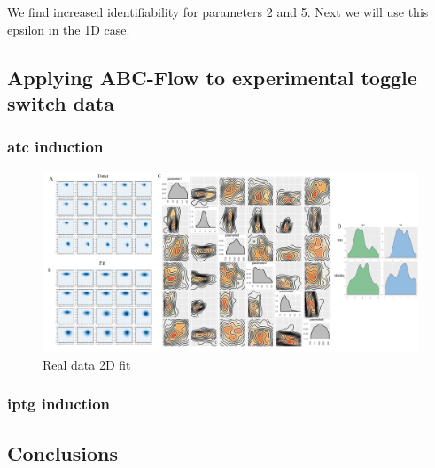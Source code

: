 We find increased identifiability for parameters 2 and 5. Next we will use this epsilon in the 1D case.

\clearpage


\subsection{Applying ABC-Flow to experimental toggle switch data}
 
 
  \subsubsection{\acrshort{atc} induction}
 
 
 \begin{figure}[htbp]
\centering
\includegraphics[scale=0.5]{chapterABCFlow/images/real_dat/real_dat_2D.png}
\caption[LoF caption]{Real data 2D fit}
\label{fig:real_dat_2d}
\end{figure}
\clearpage
\subsubsection{\acrshort{iptg} induction}
\subsection{Conclusions}

 
 